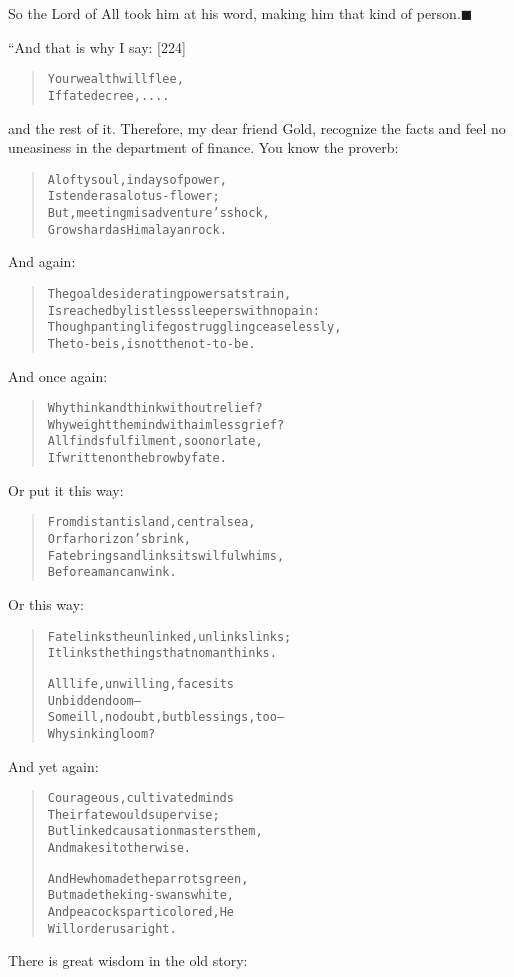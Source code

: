 \documentclass[article, twoside, 14pt]{memoir}
\newcommand{\qed}{\hfill \ensuremath{\blacksquare}}
\renewenvironment{verbatim}{%
\begin{quote}%
\vskip -10pt%
\begin{alltt}\normalfont\large}{\end{alltt}%
\end{quote}%
\vskip -10pt
} %
\begin{document}
So the Lord of All took him at his word, making him that kind of
person.\hyperref[s42]{\qed}

“And that is why I say: [224]

\begin{verbatim}
Your wealth will flee,
If fate decree, ....
\end{verbatim}
and the rest of it. Therefore, my dear friend Gold, recognize the
facts and feel no uneasiness in the department of finance. You know
the proverb:

\begin{verbatim}
A lofty soul, in days of power,
Is tender as a lotus-flower;
But, meeting misadventure's shock,
Grows hard as Himalayan rock.
\end{verbatim}
And again:

\begin{verbatim}
The goal desiderating powers at strain,
Is reached by listless sleepers with no pain:
Though panting life go struggling ceaselessly,
The to-be is, is not the not-to-be.
\end{verbatim}
And once again:

\begin{verbatim}
Why think and think without relief?
Why weight the mind with aimless grief?
All finds fulfilment, soon or late,
If written on the brow by fate.
\end{verbatim}
Or put it this way:

\begin{verbatim}
From distant island, central sea,
Or far horizon's brink,
Fate brings and links its wilful whims,
Before a man can wink.
\end{verbatim}
Or this way:

\begin{verbatim}
Fate links the unlinked, unlinks links;
It links the things that no man thinks.

All life, unwilling, faces its
    Unbidden doom--
Some ill, no doubt, but blessings, too--
    Why sink in gloom?
\end{verbatim}
And yet again:

\begin{verbatim}
Courageous, cultivated minds
    Their fate would supervise;
But linked causation masters them,
    And makes it otherwise.

And He who made the parrots green,
    But made the king-swans white,
And peacocks particolored, He
    Will order us aright.
\end{verbatim}
There is great wisdom in the old story:
\end{document}
